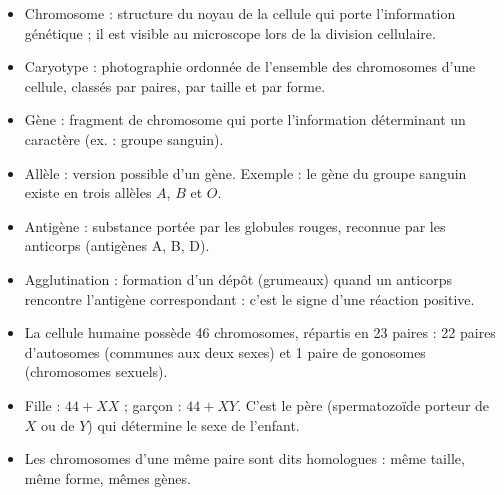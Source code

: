 \documentclass[11pt]{article}
\newcommand{\cle}[1]{{\popxbold\color{popdark}#1}}
\begin{document}
\begin{aretenir}
\begin{itemize}
  \item \cle{Chromosome} : structure du noyau de la cellule qui porte l'information génétique ; il est visible au microscope lors de la division cellulaire.
  \item \cle{Caryotype} : photographie ordonnée de l'ensemble des chromosomes d'une cellule, classés par paires, par taille et par forme.
  \item \cle{Gène} : fragment de chromosome qui porte l'information déterminant un caractère (ex. : groupe sanguin).
  \item \cle{Allèle} : version possible d'un gène. Exemple : le gène du groupe sanguin existe en trois allèles $A$, $B$ et $O$.
  \item \cle{Antigène} : substance portée par les globules rouges, reconnue par les anticorps (antigènes A, B, D).
  \item \cle{Agglutination} : formation d'un dépôt (grumeaux) quand un anticorps rencontre l'antigène correspondant : c'est le signe d'une réaction positive.
\end{itemize}
\end{aretenir}

\begin{aretenir}
\begin{itemize}
  \item La cellule humaine possède \cle{46 chromosomes}, répartis en \cle{23 paires} : 22 paires d'\cle{autosomes} (communes aux deux sexes) et 1 paire de \cle{gonosomes} (chromosomes sexuels).
  \item Fille : $44 + XX$ ; garçon : $44 + XY$. C'est le père (spermatozoïde porteur de $X$ ou de $Y$) qui détermine le sexe de l'enfant.
  \item Les chromosomes d'une même paire sont dits \cle{homologues} : même taille, même forme, mêmes gènes.
\end{itemize}
\end{aretenir}
\end{document}
